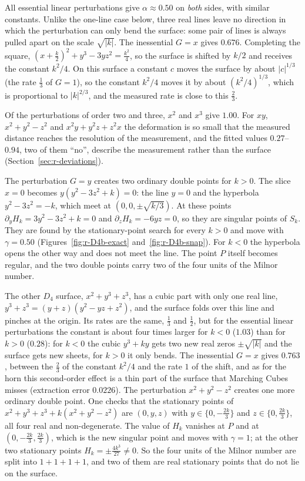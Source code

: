 \documentclass[12pt, a4paper, oneside]{book}
\theoremstyle{plain}
\theoremstyle{definition}
\theoremstyle{remark}
\theoremstyle{definition}
\begin{document}
All essential linear perturbations give $\alpha\approx0.50$ on \emph{both} sides, with similar constants. Unlike the one-line case below, three real lines leave no direction in which the perturbation can only bend the surface: some pair of lines is always pulled apart on the scale $\sqrt{|k|}$. The inessential $G=x$ gives $0.676$. Completing the square, $(x+\tfrac k2)^2+y^3-3yz^2=\tfrac{k^2}{4}$, so the surface is shifted by $k/2$ and receives the constant $k^2/4$. On this surface a constant $c$ moves the surface by about $|c|^{1/3}$ (the rate $\tfrac13$ of $G=1$), so the constant $k^2/4$ moves it by about $(k^2/4)^{1/3}$, which is proportional to $|k|^{2/3}$, and the measured rate is close to this $\tfrac23$.

Of the perturbations of order two and three, $x^2$ and $x^3$ give $1.00$. For $xy$, $x^2+y^2-z^2$ and $x^2y+y^2z+z^2x$ the deformation is so small that the measured distance reaches the resolution of the measurement, and the fitted values $0.27$--$0.94$, two of them ``no'', describe the measurement rather than the surface (Section~\ref{sec:r-deviations}).

The perturbation $G=y$ creates two ordinary double points for $k>0$. The slice $x=0$ becomes $y(y^2-3z^2+k)=0$: the line $y=0$ and the hyperbola $y^2-3z^2=-k$, which meet at $(0,0,\pm\sqrt{k/3})$. At these points $\partial_yH_k=3y^2-3z^2+k=0$ and $\partial_zH_k=-6yz=0$, so they are singular points of $S_k$. They are found by the stationary-point search for every $k>0$ and move with $\gamma=0.50$ (Figures~\ref{fig:r-D4b-exact} and~\ref{fig:r-D4b-snap}). For $k<0$ the hyperbola opens the other way and does not meet the line. The point $P$ itself becomes regular, and the two double points carry two of the four units of the Milnor number.

The other $D_4$ surface, $x^2+y^3+z^3$, has a cubic part with only one real line, $y^3+z^3=(y+z)(y^2-yz+z^2)$, and the surface folds over this line and pinches at the origin. Its rates are the same, $\tfrac13$ and $\tfrac12$, but for the essential linear perturbations the constant is about four times larger for $k<0$ ($1.03$) than for $k>0$ ($0.28$): for $k<0$ the cubic $y^3+ky$ gets two new real zeros $\pm\sqrt{|k|}$ and the surface gets new sheets, for $k>0$ it only bends. The inessential $G=x$ gives $0.763$, between the $\tfrac23$ of the constant $k^2/4$ and the rate $1$ of the shift, and as for the horn this second-order effect is a thin part of the surface that Marching Cubes misses (extraction error $0.0226$). The perturbation $x^2+y^2-z^2$ creates one more ordinary double point. One checks that the stationary points of $x^2+y^3+z^3+k(x^2+y^2-z^2)$ are $(0,y,z)$ with $y\in\{0,-\tfrac{2k}3\}$ and $z\in\{0,\tfrac{2k}3\}$, all four real and non-degenerate. The value of $H_k$ vanishes at $P$ and at $(0,-\tfrac{2k}3,\tfrac{2k}3)$, which is the new singular point and moves with $\gamma=1$; at the other two stationary points $H_k=\pm\tfrac{4k^3}{27}\neq0$. So the four units of the Milnor number are split into $1+1+1+1$, and two of them are real stationary points that do not lie on the surface.
\clearpage
\end{document}
